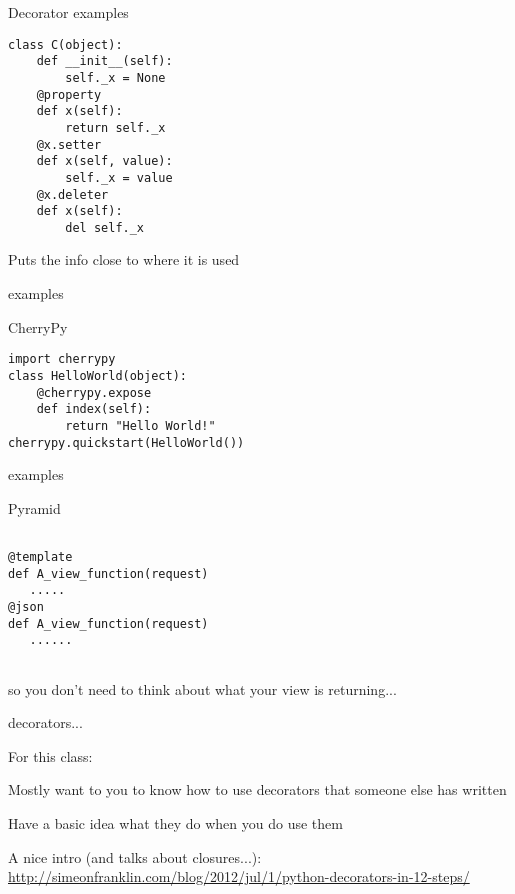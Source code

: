 \documentclass{beamer}
\begin{document}
\begin{frame}[fragile]{Decorator examples}

\begin{verbatim}
class C(object):
    def __init__(self):
        self._x = None
    @property
    def x(self):
        return self._x
    @x.setter
    def x(self, value):
        self._x = value
    @x.deleter
    def x(self):
        del self._x
\end{verbatim}

\vfill
Puts the info close to where it is used
\end{frame} 

\begin{frame}[fragile]{examples}

{\LARGE CherryPy}

\vfill
\begin{verbatim}
import cherrypy
class HelloWorld(object):
    @cherrypy.expose
    def index(self):
        return "Hello World!"
cherrypy.quickstart(HelloWorld())
\end{verbatim}

\end{frame} 

\begin{frame}[fragile]{examples}

{\LARGE Pyramid}

\vfill
\begin{verbatim}

@template
def A_view_function(request)
   .....
@json
def A_view_function(request)
   ......


\end{verbatim}

so you don't need to think about what your view is returning...

\end{frame} 


\begin{frame}[fragile]{decorators...}

{\Large For this class:}

\vfill
{\Large Mostly want to you to know how to use decorators that someone else has written}

\vfill
{\Large Have a basic idea what they do when you do use them}

\vfill
{\large A nice intro (and talks about closures...):}\\
\url{http://simeonfranklin.com/blog/2012/jul/1/python-decorators-in-12-steps/}

\end{frame} 
\end{document}
